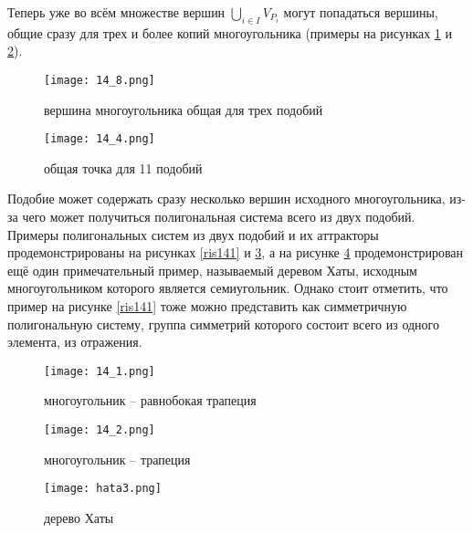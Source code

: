Теперь уже во всём множестве вершин $\bigcup\limits_{i\in I}V_{P_i}$ могут попадаться вершины, общие сразу для трех и более копий многоугольника  (примеры на рисунках \ref{ris148} и \ref{ris144}).

\begin{figure}[h]
\centering
\texttt{[image: 14\_8.png]}
\caption{вершина многоугольника общая для трех подобий}%
\label{ris148}%
\end{figure}

\begin{figure}[h]
\centering
\texttt{[image: 14\_4.png]}
\caption{общая точка для 11 подобий}%
\label{ris144}%
\end{figure}

Подобие может содержать сразу несколько вершин исходного многоугольника, из-за чего может получиться полигональная система всего из двух подобий. Примеры полигональных систем из двух подобий и их аттракторы продемонстрированы на рисунках \ref{ris141} и \ref{ris142}, а на рисунке \ref{hata} продемонстрирован ещё один примечательный пример, называемый деревом Хаты, исходным многоугольником которого является семиугольник. Однако стоит отметить, что пример на рисунке \ref{ris141} тоже можно представить как симметричную полигональную систему, группа симметрий которого состоит всего из одного элемента, из отражения.

\begin{figure}[h!]
\begin{center}
\begin{minipage}[h]{0.5\linewidth}
\texttt{[image: 14\_1.png]}
\caption{многоугольник -- равнобокая трапеция} %
\label{ris141} %
\end{minipage}
\hfill
\begin{minipage}[h]{0.4\linewidth}
\texttt{[image: 14\_2.png]}
\caption{многоугольник -- трапеция}%
\label{ris142}%
\end{minipage}
\end{center}
\end{figure}

\begin{figure}[h]
\centering
\texttt{[image: hata3.png]}
\caption{дерево Хаты}%
\label{hata}%
\end{figure}


